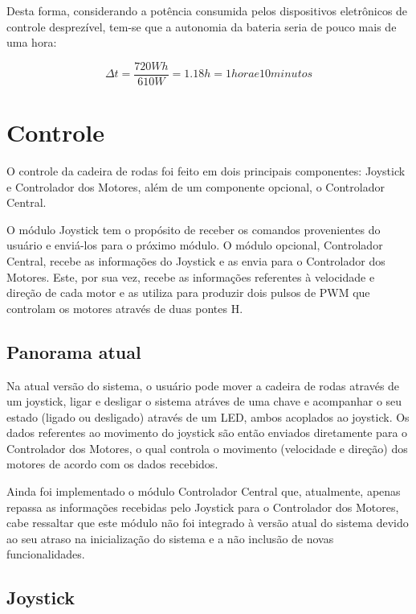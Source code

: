 		Desta forma, considerando a potência consumida pelos dispositivos eletrônicos de controle desprezível, tem-se que a autonomia da bateria seria de pouco mais de uma hora:

		\begin{equation}
			\Delta t = \frac{720 Wh}{610 W} = 1.18 h = 1 hora e 10 minutos
		\end{equation}

\section{Controle}

	O controle da cadeira de rodas foi feito em dois principais componentes: Joystick e Controlador dos Motores, além de um componente opcional, o Controlador Central.

	O módulo Joystick tem o propósito de receber os comandos provenientes do usuário e enviá-los para o próximo módulo. O módulo opcional, Controlador Central, recebe as informações do Joystick e as envia para o Controlador dos Motores. Este, por sua vez, recebe as informações referentes à velocidade e direção de cada motor e as utiliza para produzir dois pulsos de PWM que controlam os motores através de duas pontes H.

	\subsection{Panorama atual}

		Na atual versão do sistema, o usuário pode mover a cadeira de rodas através de um joystick, ligar e desligar o sistema atráves de uma chave e acompanhar o seu estado (ligado ou desligado) através de um LED, ambos acoplados ao joystick. Os dados referentes ao movimento do joystick são então enviados diretamente para o Controlador dos Motores, o qual controla o movimento (velocidade e direção) dos motores de acordo com os dados recebidos.

		Ainda foi implementado o módulo Controlador Central que, atualmente, apenas repassa as informações recebidas pelo Joystick para o Controlador dos Motores, cabe ressaltar que este módulo não foi integrado à versão atual do sistema devido ao seu atraso na inicialização do sistema e a não inclusão de novas funcionalidades.

	\subsection{Joystick}

